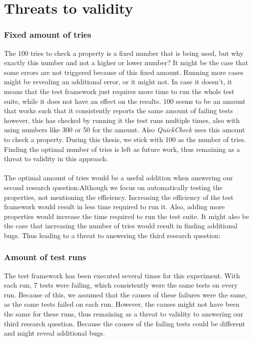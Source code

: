 \section{Threats to validity}

\subsubsection{Fixed amount of tries}
The 100 tries to check a property is a fixed number that is being used, but why
exactly this number and not a higher or lower number? It might be the case that
some errors are not triggered because of this fixed amount. Running more cases
might be revealing an additional error, or it might not. In case it doesn't, it
means that the test framework just requires more time to run the whole test suite,
while it does not have an effect on the results. 100 seems to be an amount that
works such that it consistently reports the same amount of failing tests
however, this has checked by running it the test runs multiple times, also with
using numbers like 300 or 50 for the amount. Also \textit{QuickCheck} uses this
amount to check a property. During this thesis, we stick with 100 as the number
of tries. Finding the optimal number of tries is left as future work, thus
remaining as a threat to validity in this approach.\\
\\
The optimal amount of tries would be a useful addition when answering our second research question:\rqTwo Although we focus on automatically testing the properties, not mentioning the efficiency. Increasing the efficiency of the test framework would result in less time required to run it. Also, adding more properties would increase the time required to run the test suite. It might also be the case that increasing the number of tries would result in finding additional bugs. Thus leading to a threat to answering the third research question:\rqThree

\subsubsection{Amount of test runs}
The test framework has been executed several times for this experiment. With
each run, 7 tests were failing, which consistently were the same tests on every
run. Because of this, we assumed that the causes of these failures were the
same, as the same tests failed on each run. However, the causes might not have
been the same for these runs, thus remaining as a threat to validity to
answering our third research question. Because the causes of the failing tests
could be different and might reveal additional bugs.

